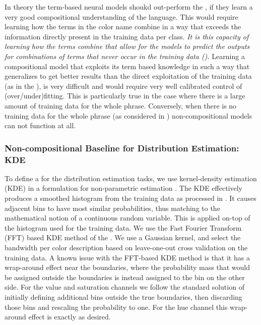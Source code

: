 In theory the term-based neural models shoukd out-perform the \empmodel{}, if they learn a very good compositional understanding of the language.
This would require learning how the terms in the color name combine in a way that exceeds the information directly present in the training data per class.
\emph{It is this capacity of learning how the terms combine that allow for the models to predict the outputs for combinations of terms that never occur in the training data ().}
Learning a compositional model that exploits its term based knowledge in such a way  that generalizes to get better results than the direct exploitation of the training data (as in the \empmodel{}), is very difficult and would require very well calibrated control of (over/under)fitting.
This is particularly true in the case where there  is a  large amount of training data for the whole phrase.
Conversely, when there is no training data for the whole phrase (as considered in ) non-compositional models can not function at all.



\subsubsection{Non-compositional Baseline for Distribution Estimation: KDE}\label{sec:direct-histogram} \label{sec:kernel-density-based-smoothing}
To define a \empmodel{} for the distribution estimation tasks,
we use kernel-density estimation (KDE) in a formulation for non-parametric estimation \parencite{silverman1986density} .
The KDE effectively produces a smoothed histogram from the training data as processed in .
It causes adjacent bins to have most similar probabilities, thus matching to the mathematical notion of a continuous random variable.
This is applied on-top of the histogram used for the training data.
We use the Fast Fourier Transform (FFT) based KDE method of the \textcite{silverman1982algorithm}.
We use a Gaussian kernel, and select the bandwidth per color description based on leave-one-out cross validation on the training data.
A known issue with the FFT-based KDE method is that it has a wrap-around effect near the boundaries, where the probability mass that would be assigned outside the boundaries is instead assigned to the bin on the other side.
For the value and saturation channels we follow the standard solution of initially defining additional bins outside the true boundaries, then discarding those bins and rescaling the probability to one.
For the hue channel this wrap-around effect is exactly as desired.


